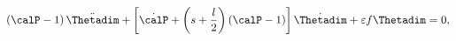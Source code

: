 \begin{equation}
\label{eq:evolthetadim}
\left(\calP - 1 \right) \ddot{\Thetadim} + \left[ \dot{\calP} +
\left(s + \dfrac{l}{2} \right) \left(\calP - 1 \right) \right]
\dot{\Thetadim} + \varepsilon f \Thetadim = 0,
\end{equation}


